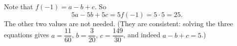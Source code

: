 Note that $f(-1)=a-b+c$. So
\[5a-5b+5c=5f(-1)=5\cdot5=\boxed{25}.\]
The other two values are not needed. (They are consistent: solving the three equations gives $a=\dfrac{11}{60}$, $b=\dfrac{3}{20}$, $c=\dfrac{149}{30}$, and indeed $a-b+c=5$.)
